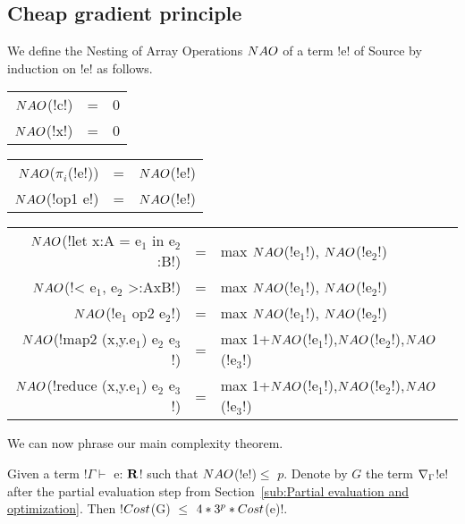 

\subsection{Cheap gradient principle}

We define the Nesting of Array Operations $NAO$ of a term !e! of Source by induction on !e! as follows.

\begin{center}
\begin{tabular}{r c l}
    $NAO$(!c!) &=& 0 \\
    $NAO$(!x!) &=& 0 \\
\end{tabular}
    \begin{tabular}{r c l}
    $NAO$($\pi_i$(!e!)) &=& $NAO$(!e!)\\
    $NAO$(!op1 e!) &=& $NAO$(!e!) \\
\end{tabular}
\end{center}

\begin{center}
\begin{tabular}{r c l}
    $NAO$(!let x:A = e$_1$ in e$_2$:B!) &=& max $NAO$(!e$_1$!), $NAO$(!e$_2$!)  \\ 
    $NAO$(!< e$_1$, e$_2$ >:AxB!) &=& max $NAO$(!e$_1$!), $NAO$(!e$_2$!) \\ 
    $NAO$(!e$_1$ op2 e$_2$!) &=& max $NAO$(!e$_1$!), $NAO$(!e$_2$!)\\
    $NAO$(!map2 (x,y.e$_1$) e$_2$ e$_3$!) &=& max 1+$NAO$(!e$_1$!),$NAO$(!e$_2$!),$NAO$(!e$_3$!) \\
    $NAO$(!reduce (x,y.e$_1$) e$_2$ e$_3$!) &=& max 1+$NAO$(!e$_1$!),$NAO$(!e$_2$!),$NAO$(!e$_3$!) \\
\end{tabular}
\end{center}

We can now phrase our main complexity theorem.

\begin{theorem}
    \label{thm:complexity}
    Given a term !$\Gamma \vdash$ e: $\mathbf{R}$! such that $NAO$(!e!)$\leq$ $p$.
    Denote by $G$ the term $\nabla_\Gamma$!e! after the partial evaluation step from Section~\ref{sub:Partial evaluation and optimization}.
    Then !$Cost$(G) $\leq$ $4*3^{p}*Cost$(e)!.
\end{theorem}

